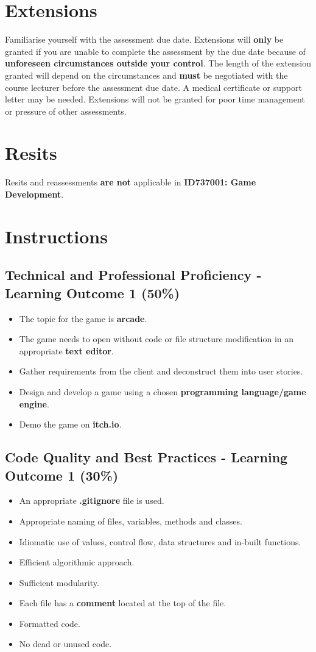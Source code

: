 \documentclass{article}
\begin{document}
\section*{Extensions}
Familiarise yourself with the assessment due date. Extensions will \textbf{only} be granted if you are unable to complete the assessment by the due date because of \textbf{unforeseen circumstances outside your control}. The length of the extension granted will depend on the circumstances and \textbf{must} be negotiated with the course lecturer before the assessment due date. A medical certificate or support letter may be needed. Extensions will not be granted for poor time management or pressure of other assessments.

\section*{Resits}
Resits and reassessments \textbf{are not} applicable in \textbf{ID737001: Game Development}.

\section*{Instructions}

\subsection*{Technical and Professional Proficiency - Learning Outcome 1 (50\%)}
\begin{itemize}
	 \item The topic for the game is \textbf{arcade}. 
	 \item The game needs to open without code or file structure modification in an appropriate \textbf{text editor}.
	 \item Gather requirements from the client and deconstruct them into user stories.
	 \item Design and develop a game using a chosen \textbf{programming language/game engine}.
	 \item Demo the game on \textbf{itch.io}.
\end{itemize} 

\subsection*{Code Quality and Best Practices - Learning Outcome 1 (30\%)}
\begin{itemize}
    \item An appropriate \textbf{.gitignore} file is used. 
    \item Appropriate naming of files, variables, methods and classes.
    \item Idiomatic use of values, control flow, data structures and in-built functions.
    \item Efficient algorithmic approach.
    \item Sufficient modularity.
    \item Each file has a \textbf{comment} located at the top of the file. 
    \item Formatted code.
    \item No dead or unused code.
\end{itemize} 
\end{document}
